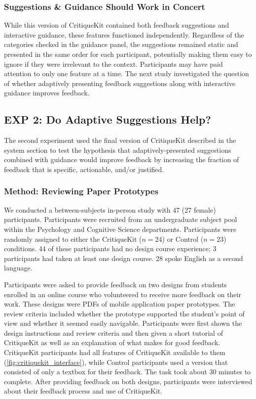 \subsubsection{Suggestions \& Guidance Should Work in Concert}
While this version of CritiqueKit contained both feedback suggestions and interactive guidance, these features functioned independently. Regardless of the categories checked in the guidance panel, the suggestions remained static and presented in the same order for each participant, potentially making them easy to ignore if they were irrelevant to the context. Participants may have paid attention to only one feature at a time. The next study investigated the question of whether adaptively presenting feedback suggestions along with interactive guidance improves feedback. 

\subsection{EXP 2: Do Adaptive Suggestions Help?}
The second experiment used the final version of CritiqueKit described in the system section to test the hypothesis that adaptively-presented suggestions combined with guidance would improve feedback by increasing the fraction of feedback that is specific, actionable, and/or justified.

\subsubsection{Method: Reviewing Paper Prototypes}
We conducted a between-subjects in-person study with 47 (27 female) participants. Participants were recruited from an undergraduate subject pool within the Psychology and Cognitive Science departments. Participants were randomly assigned to either the CritiqueKit ($n = 24$) or Control ($n = 23$) conditions. 44 of these participants had no design course experience; 3 participants had taken at least one design course. 28 spoke English as a second language. 

Participants were asked to provide feedback on two designs from students enrolled in an online course who volunteered to receive more feedback on their work. These designs were PDFs of mobile application paper prototypes. The review criteria included whether the prototype supported the student's point of view and whether it seemed easily navigable. Participants were first shown the design instructions and review criteria and then given a short tutorial of CritiqueKit as well as an explanation of what makes for good feedback. CritiqueKit participants had all features of CritiqueKit available to them (\autoref{fig:critiquekit_interface}), while Control participants used a version that consisted of only a textbox for their feedback. The task took about 30 minutes to complete. After providing feedback on both designs, participants were interviewed about their feedback process and use of CritiqueKit. 

